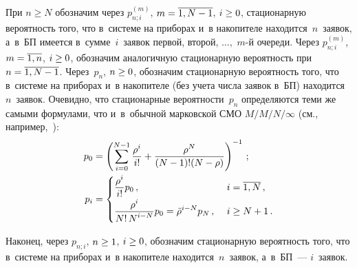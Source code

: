 \begin{multicols}{2}
При $n\ge N$ обозначим через
$p^{(m)}_{n;i}$, ${m\hm=\overline{1,N-1}}$, ${i\hm\ge 0}$,
стационарную вероятность того, что в~системе на
приборах и~в накопителе находится~$n$~заявок,
а~в~БП имеется в~сумме~$i$~заявок первой,
второй, $\ldots,$ $m$-й очереди.
Через
$p^{(m)}_{n;i}$, ${m\hm=\overline{1,n}}$, ${i\hm\ge 0}$,
обозначим аналогичную стационарную вероятность
при $n\hm=\overline{1,N-1}$.
Через~$p_n$, $n\hm\ge 0$, обозначим
стационарную вероятность того, что в~системе на
приборах и~в накопителе (без учета числа заявок в~БП) находится~$n$~заявок.
Очевидно, что стационарные вероятности~$p_n$
определяются теми же самыми формулами, что и~в~обычной
марковской СМО $M/M/N/\infty$
(см., например,~\cite{boch}):
\begin{align}
p_{0} &= \left( \sum\limits_{i=0}^{N-1} \displaystyle\frac{\displaystyle \rho^i\mathstrut}{\displaystyle i!\mathstrut} +
\displaystyle\frac{\displaystyle \rho^N\mathstrut}{\displaystyle (N-1)! (N-\rho)\mathstrut}
\right)^{-1} \,;\label{3-1}
\\
p_{i} &= \begin{cases}
\displaystyle\frac{\displaystyle \rho^i \mathstrut}{\displaystyle i!\mathstrut} p_{0}\,, &\ i=\overline{1,N}\,,
\\
\displaystyle\frac{\displaystyle \rho^i\mathstrut}{\displaystyle N!\, N^{i-N}\mathstrut} p_{0}
= \tilde \rho^{i-N} p_{N}\,, &\ i\ge N+1\,.
\end{cases}
\label{3-2}
\end{align}

Наконец, через $p_{n;i}$, ${n\hm\ge 1}$, ${i\hm\ge 0}$, обозначим
стационарную вероятность того, что в~системе на
приборах и~в накопителе находится~$n$~заявок,
а~в~БП~--- $i$~заявок.


\end{multicols}
